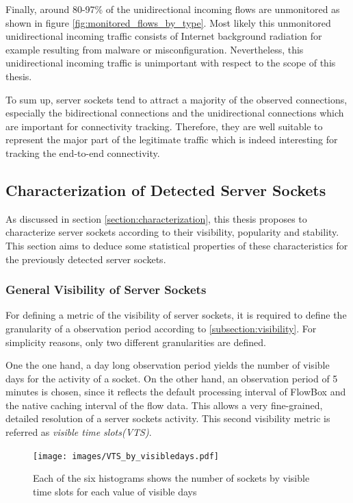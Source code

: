 Finally, around 80-97\% of the unidirectional incoming flows are unmonitored as shown in figure \ref{fig:monitored_flows_by_type}. 
Most likely this unmonitored unidirectional incoming traffic consists of Internet background radiation \citep{Wustrow10,Pang04} for example resulting from malware or misconfiguration. 
Nevertheless, this unidirectional incoming traffic is unimportant with respect to the scope of this thesis.

To sum up, \glspl{server socket} tend to attract a majority of the observed connections, especially the bidirectional connections and the unidirectional connections which are important for connectivity tracking. 
Therefore, they are well suitable to represent the major part of the legitimate traffic which is indeed interesting for tracking the end-to-end connectivity.

\newpage 
\subsection{Characterization of Detected Server Sockets}

As discussed in section \ref{section:characterization}, this thesis proposes to characterize \glspl{server socket} according to their visibility, popularity and stability. This section aims to deduce some statistical properties of these characteristics for the previously detected \glspl{server socket}.

\subsubsection{General Visibility of Server Sockets}

For defining a metric of the visibility of \glspl{server socket}, it is required to define the granularity of a observation period according to \ref{subsection:visibility}. For simplicity reasons, only two different granularities are defined.

One the one hand, a day long observation period yields the number of visible days for the activity of a socket. 
On the other hand, an observation period of 5 minutes is chosen, since it reflects the default processing interval of FlowBox and the native caching interval of the flow data. 
This allows a very fine-grained, detailed resolution of a \glspl{server socket} activity. 
This second visibility metric is referred as \emph{visible time slots(VTS)}.
\begin{figure}
	[ht] \centering 
	\texttt{[image: images/VTS\_by\_visibledays.pdf]} \caption{Each of the six histograms shows the number of sockets by visible time slots for each value of visible days} 
	\label{fig:vts_by_visibledays} 
\end{figure}

